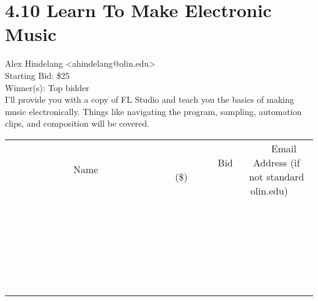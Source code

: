 \documentclass[11pt]{article}
\begin{document}
					\section*{4.10 Learn To Make Electronic Music}
					Alex Hindelang <ahindelang@olin.edu> \\
					Starting Bid: \$25 \\
					Winner(s): Top bidder \\
					I'll provide you with a copy of FL Studio and teach you the basics of making music electronically. Things like navigating the program, sampling, automation clips, and composition will be covered. \\
					[6ex]
					\begin{tabular}{c c c}
						~~~~~~~~~~~~~Name~~~~~~~~~~~~~ & ~~~~~~~~~Bid (\$)~~~~~~~~~ & ~~~Email Address (if not standard olin.edu)~~~ \\
				
 & & \\
\hline
 & & \\
\hline
 & & \\
\hline
 & & \\
\hline
 & & \\
\hline
 & & \\
\hline
 & & \\
\hline
 & & \\
\hline
 & & \\
\hline
 & & \\
\hline
 & & \\
\hline
 & & \\
\hline
 & & \\
\hline
 & & \\
\hline
 & & \\
\hline
 & & \\
\hline
 & & \\
\hline
 & & \\
\hline
 & & \\
\hline
 & & \\
\hline
 & & \\
\hline
 & & \\
\hline
 & & \\
\hline
 & & \\
\hline
 & & \\
\hline
 & & \\
\hline
					\end{tabular}
					\clearpage
				
\end{document}
